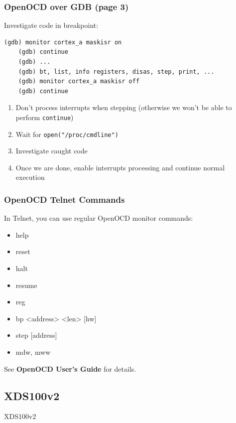 \begin{frame}[containsverbatim]
  \frametitle{OpenOCD over GDB (page 3)}
  Investigate code in breakpoint:
  \begin{lstlisting}[numbers=none]
    (gdb) monitor cortex_a maskisr on
    (gdb) continue
    (gdb) ...
    (gdb) bt, list, info registers, disas, step, print, ...
    (gdb) monitor cortex_a maskisr off
    (gdb) continue
  \end{lstlisting}
  \begin{enumerate}
    \item Don't process interrupts when stepping (otherwise we won't be
          able to perform \texttt{continue})
    \item Wait for \texttt{open("/proc/cmdline")}
    \item Investigate caught code
    \item Once we are done, enable interrupts processing and continue normal
          execution
  \end{enumerate}
\end{frame}

\begin{frame}[containsverbatim]
  \frametitle{OpenOCD Telnet Commands}
  In Telnet, you can use regular OpenOCD monitor commands:
  \begin{itemize}
    \item help
    \item reset
    \item halt
    \item resume
    \item reg
    \item bp <address> <len> [hw]
    \item step [address]
    \item mdw, mww
  \end{itemize}
  See \textbf{OpenOCD User's Guide} for details.
\end{frame}

\subsection{XDS100v2}

\begin{frame}[standout]
  XDS100v2
\end{frame}

